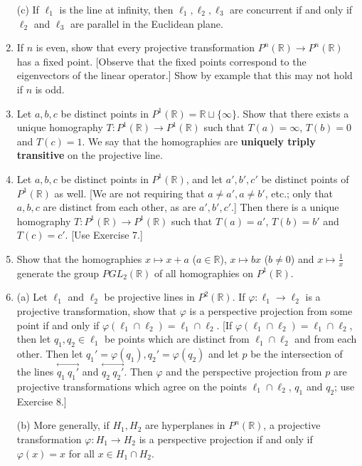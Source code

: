 \documentclass[leqno]{book}
\begin{document}
\begin{enumerate}
(c) If $\ell_1$ is the line at infinity, then $\ell_1,\ell_2,\ell_3$ are concurrent if and only if $\ell_2$ and $\ell_3$ are parallel in the Euclidean plane.

\item If $n$ is even, show that every projective transformation $P^n(\mathbb R)\to P^n(\mathbb R)$ has a fixed point.  [Observe that the fixed points correspond to the eigenvectors of the linear operator.]  Show by example that this may not hold if $n$ is odd.

\item Let $a,b,c$ be distinct points in $P^1(\mathbb R)=\mathbb R\sqcup\{\infty\}$.  Show that there exists a unique homography $T:P^1(\mathbb R)\to P^1(\mathbb R)$ such that $T(a)=\infty$, $T(b)=0$ and $T(c)=1$.  We say that the homographies are \textbf{uniquely triply transitive} on the projective line.

\item Let $a,b,c$ be distinct points in $P^1(\mathbb R)$, and let $a',b',c'$ be distinct points of $P^1(\mathbb R)$ as well.  [We are not requiring that $a\ne a',a\ne b'$, etc.; only that $a,b,c$ are distinct from each other, as are $a',b',c'$.]  Then there is a unique homography $T:P^1(\mathbb R)\to P^1(\mathbb R)$ such that $T(a)=a'$, $T(b)=b'$ and $T(c)=c'$.  [Use Exercise 7.]

\item Show that the homographies $x\mapsto x+a$ ($a\in\mathbb R$), $x\mapsto bx$ ($b\ne 0$) and $x\mapsto\frac 1x$ generate the group $PGL_2(\mathbb R)$ of all homographies on $P^1(\mathbb R)$.

\item (a) Let $\ell_1$ and $\ell_2$ be projective lines in $P^2(\mathbb R)$.  If $\varphi:\ell_1\to\ell_2$ is a projective transformation, show that $\varphi$ is a perspective projection from some point if and only if $\varphi(\ell_1\cap\ell_2)=\ell_1\cap\ell_2$.  [If $\varphi(\ell_1\cap\ell_2)=\ell_1\cap\ell_2$, then let $q_1,q_2\in\ell_1$ be points which are distinct from $\ell_1\cap\ell_2$ and from each other.  Then let $q_1'=\varphi(q_1),q_2'=\varphi(q_2)$ and let $p$ be the intersection of the lines $\overset{\longleftrightarrow}{q_1~q_1'}$ and $\overset{\longleftrightarrow}{q_2~q_2'}$.  Then $\varphi$ and the perspective projection from $p$ are projective transformations which agree on the points $\ell_1\cap\ell_2$, $q_1$ and $q_2$; use Exercise 8.]

(b) More generally, if $H_1,H_2$ are hyperplanes in $P^n(\mathbb R)$, a projective transformation $\varphi:H_1\to H_2$ is a perspective projection if and only if $\varphi(x)=x$ for all $x\in H_1\cap H_2$.


\end{enumerate}
\end{document}
